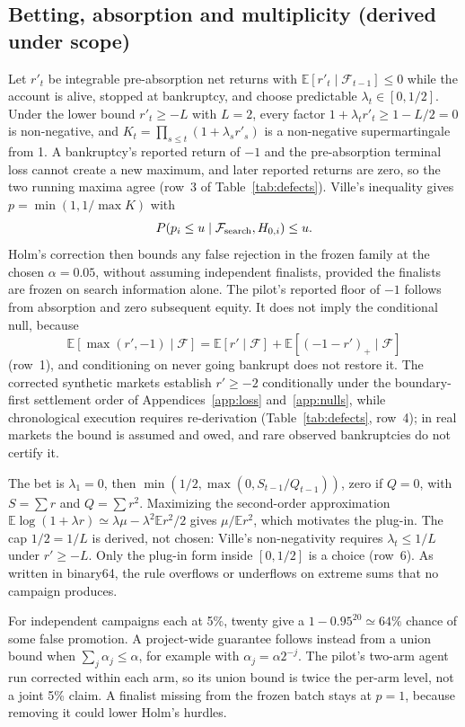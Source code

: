 \documentclass[11pt]{article}
\newcommand{\E}{\mathbb{E}}
\begin{document}
\subsection{Betting, absorption and multiplicity (derived under scope)}\label{app:bet}

Let $r'_t$ be integrable pre-absorption net returns with $\E[r'_t\mid\mathcal F_{t-1}]\le0$ while the account is alive, stopped at bankruptcy, and choose predictable $\lambda_t\in[0,1/2]$. Under the lower bound $r'_t\ge-L$ with $L=2$, every factor $1+\lambda_tr'_t\ge1-L/2=0$ is non-negative, and $K_t=\prod_{s\le t}(1+\lambda_sr'_s)$ is a non-negative supermartingale from 1. A bankruptcy's reported return of $-1$ and the pre-absorption terminal loss cannot create a new maximum, and later reported returns are zero, so the two running maxima agree (row~3 of Table~\ref{tab:defects}). Ville's inequality \cite{ville1939} gives $p=\min(1,1/\max K)$ with
\[
 P(p_i\le u\mid\mathcal F_{\rm search},H_{0,i})\le u.
\]
Holm's correction \cite{holm1979} then bounds any false rejection in the frozen family at the chosen $\alpha=0.05$, without assuming independent finalists, provided the finalists are frozen on search information alone. The pilot's reported floor of $-1$ follows from absorption and zero subsequent equity. It does not imply the conditional null, because
\[
 \E[\max(r',-1)\mid\mathcal F]=\E[r'\mid\mathcal F]+\E[(-1-r')_+\mid\mathcal F]
\]
(row~1), and conditioning on never going bankrupt does not restore it. The corrected synthetic markets establish $r'\ge-2$ conditionally under the boundary-first settlement order of Appendices~\ref{app:loss} and~\ref{app:nulls}, while chronological execution requires re-derivation (Table~\ref{tab:defects}, row~4); in real markets the bound is assumed and owed, and rare observed bankruptcies do not certify it.

The bet is $\lambda_1=0$, then $\min(1/2,\max(0,S_{t-1}/Q_{t-1}))$, zero if $Q=0$, with $S=\sum r$ and $Q=\sum r^2$. Maximizing the second-order approximation $\E\log(1+\lambda r)\simeq\lambda\mu-\lambda^2\E r^2/2$ gives $\mu/\E r^2$, which motivates the plug-in. The cap $1/2=1/L$ is derived, not chosen: Ville's non-negativity requires $\lambda_t\le1/L$ under $r'\ge-L$. Only the plug-in form inside $[0,1/2]$ is a choice (row~6). As written in binary64, the rule overflows or underflows on extreme sums that no campaign produces.

For independent campaigns each at 5\%, twenty give a $1-0.95^{20}\simeq64\%$ chance of some false promotion. A project-wide guarantee follows instead from a union bound when $\sum_j\alpha_j\le\alpha$, for example with $\alpha_j=\alpha2^{-j}$. The pilot's two-arm agent run corrected within each arm, so its union bound is twice the per-arm level, not a joint 5\% claim. A finalist missing from the frozen batch stays at $p=1$, because removing it could lower Holm's hurdles.
\end{document}
